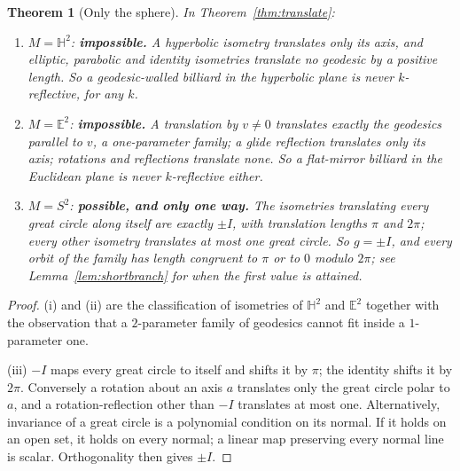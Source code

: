 \documentclass[11pt,a4paper]{article}
\theoremstyle{plain}
\newtheorem{theorem}{Theorem}[section]
\theoremstyle{definition}
\theoremstyle{remark}
\begin{document}
\begin{theorem}[Only the sphere]\label{thm:nohyp}
In Theorem~\ref{thm:translate}:
\begin{enumerate}[label=\textup{(\roman*)},nosep]
  \item $M=\mathbb{H}^2$: \textbf{impossible.} A hyperbolic isometry translates only
        its axis, and elliptic, parabolic and identity isometries translate no
        geodesic by a positive length. So a geodesic-walled billiard in the
        hyperbolic plane is never $k$-reflective, for any $k$.
  \item $M=\mathbb{E}^2$: \textbf{impossible.} A translation by $v\neq0$ translates
        exactly the geodesics parallel to $v$, a \emph{one}-parameter family; a
        glide reflection translates only its axis; rotations and reflections
        translate none. So a flat-mirror billiard in the Euclidean plane is never
        $k$-reflective either.
  \item $M=S^2$: \textbf{possible, and only one way.} The isometries translating
        \emph{every} great circle along itself are exactly $\pm I$, with translation
        lengths $\pi$ and $2\pi$; every other isometry translates at most one great
        circle. So $g=\pm I$, and every orbit of the family has length
        congruent to $\pi$ or to $0$ modulo $2\pi$; see
        Lemma~\ref{lem:shortbranch} for when the first value is attained.
\end{enumerate}
\end{theorem}

\begin{proof}
(i) and (ii) are the classification of isometries of $\mathbb{H}^2$ and
$\mathbb{E}^2$ together with the observation that a $2$-parameter family of
geodesics cannot fit inside a $1$-parameter one.

(iii) $-I$ maps every great circle to itself and shifts it by $\pi$; the identity
shifts it by $2\pi$. Conversely a rotation about an axis $a$ translates only the
great circle polar to $a$, and a rotation-reflection other than $-I$ translates at
most one. Alternatively, invariance of a great circle is a polynomial
condition on its normal. If it holds on an open set, it holds on every
normal; a linear map preserving every normal line is scalar. Orthogonality
then gives $\pm I$.
\end{proof}
\end{document}
